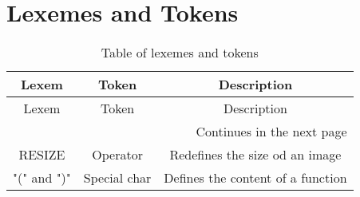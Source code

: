 \section{Lexemes and Tokens}
\begin{longtable}[c]{|c|c|c|}
\caption{Table of lexemes and tokens}\\
\hline
    Lexem & Token & Description \\
\hline
\endfirsthead
\hline
    Lexem & Token & Description \\
\hline
\endhead %
\hline \multicolumn{3}{r}{{Continues in the next page}} \\ \hline
\endfoot %
\hline
\endlastfoot %
\hline

\hline
    RESIZE & Operator & Redefines the size od an image \\
    "(" and ")" & Special char & Defines the content of a function \\
\hline

\end{longtable}